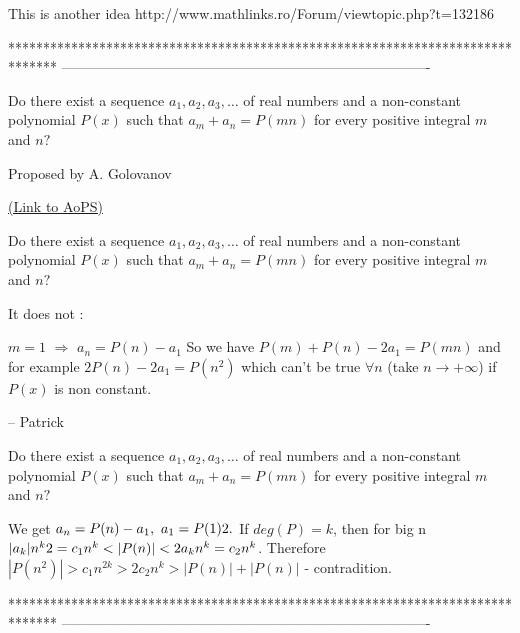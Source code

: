 \begin{solution}
	This is another idea http://www.mathlinks.ro/Forum/viewtopic.php?t=132186  
\end{solution}
*******************************************************************************
-------------------------------------------------------------------------------

\begin{problem}
	Do there exist a sequence $a_{1}, a_{2}, a_{3}, \ldots$ of real numbers and a non-constant polynomial $P(x)$ such that $a_{m}+a_{n}=P(mn)$ for every positive integral $m$ and $n?$

\begin{italicized}Proposed by A. Golovanov\end{italicized}
	\flushright \href{https://artofproblemsolving.com/community/c6h151112}{(Link to AoPS)}
\end{problem}



\begin{solution}
	\begin{tcolorbox}Do there exist a sequence $a_{1}, a_{2}, a_{3}, \ldots$ of real numbers and a non-constant polynomial $P(x)$ such that $a_{m}+a_{n}=P(mn)$ for every positive integral $m$ and $n?$\end{tcolorbox}

It does not :

$m=1$ $\Rightarrow $ $a_{n}=P(n)-a_{1}$
So we have $P(m)+P(n)-2a_{1}=P(mn)$ and for example $2P(n)-2a_{1}=P(n^{2})$ which can't be true $\forall n$ (take $n\rightarrow+\infty$) if $P(x)$ is non constant.

-- 
Patrick
\end{solution}



\begin{solution}
	\begin{tcolorbox}Do there exist a sequence $a_{1}, a_{2}, a_{3}, \ldots$ of real numbers and a non-constant polynomial $P(x)$ such that $a_{m}+a_{n}=P(mn)$ for every positive integral $m$ and $n?$\end{tcolorbox}
We get $a_{n}=P(n)-a_{1}, \ a_{1}=P(1)\/2.$ If $deg(P)=k$, then for big n $|a_{k}|n^{k}\/2=c_{1}n^{k}<|P(n)|<2a_{k}n^{k}=c_{2}n^{k}$.
Therefore $|P(n^{2})|>c_{1}n^{2k}>2c_{2}n^{k}>|P(n)|+|P(n)|$ - contradition.
\end{solution}
*******************************************************************************
-------------------------------------------------------------------------------

